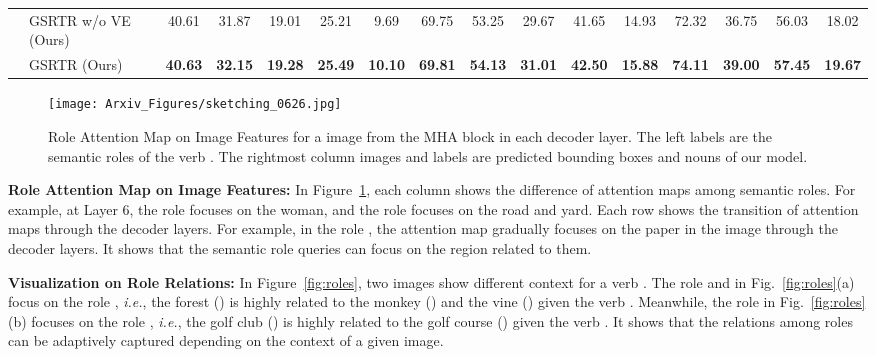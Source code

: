 \begin{table}[!t]
{\begin{tabular}{l|l|ccccc|ccccc|cccc}
        \\    
        \cline{2-16}
            & GSRTR w/o VE (Ours)
            & 40.61 & 31.87 & 19.01 & 25.21 & 9.69
            & 69.75 & 53.25 & 29.67 & 41.65 & 14.93
            & 72.32 & 36.75 & 56.03 & 18.02        
        \\
            & GSRTR (Ours)
            & \textbf{40.63} & \textbf{32.15} & \textbf{19.28} & \textbf{25.49} & \textbf{10.10}       
            & \textbf{69.81} & \textbf{54.13} & \textbf{31.01} & \textbf{42.50} & \textbf{15.88}
            & \textbf{74.11} & \textbf{39.00} & \textbf{57.45} & \textbf{19.67}      
        \\
        \hline
    \end{tabular}}
\end{table}

\begin{figure}[!t]
    \centering
        \texttt{[image: Arxiv\_Figures/sketching\_0626.jpg]}
\caption{
    Role Attention Map on Image Features for a  image from the MHA block in each decoder layer.
    The left labels are the semantic roles of the verb .
    The rightmost column images and labels are predicted bounding boxes and nouns of our model.
}
\label{fig:role_img}
\end{figure}

\noindent
\textbf{Role Attention Map on Image Features:}
In Figure~\ref{fig:role_img}, each column shows the difference of attention maps among semantic roles.
For example, at Layer 6, the role  focuses on the woman, and the role  focuses on the road and yard.
Each row shows the transition of attention maps through the decoder layers.
For example, in the role , the attention map gradually focuses on the paper in the image through the decoder layers.
It shows that the semantic role queries can focus on the region related to them.

\noindent
\textbf{Visualization on Role Relations:}
In Figure~\ref{fig:roles}, two images show different context for a verb .
The role  and  in Fig.~\ref{fig:roles}(a) focus on the role , \emph{i.e.}, the forest () is highly related to the monkey () and the vine () given the verb .
Meanwhile, the role  in Fig.~\ref{fig:roles}(b) focuses on the role , \emph{i.e.}, the golf club () is highly related to the golf course () given the verb .
It shows that the relations among roles can be adaptively captured depending on the context of a given image.

